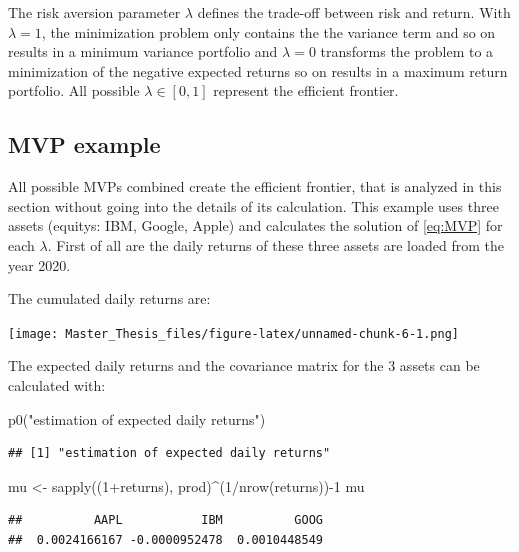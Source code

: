 \documentclass[
  oneside]{book}
\newenvironment{Shaded}{\begin{snugshade}}{\end{snugshade}}
\newcommand{\DecValTok}[1]{\textcolor[rgb]{0.00,0.00,0.81}{#1}}
\newcommand{\FunctionTok}[1]{\textcolor[rgb]{0.00,0.00,0.00}{#1}}
\newcommand{\NormalTok}[1]{#1}
\newcommand{\OtherTok}[1]{\textcolor[rgb]{0.56,0.35,0.01}{#1}}
\newcommand{\SpecialCharTok}[1]{\textcolor[rgb]{0.00,0.00,0.00}{#1}}
\newcommand{\StringTok}[1]{\textcolor[rgb]{0.31,0.60,0.02}{#1}}
\begin{document}
The risk aversion parameter \(\lambda\) defines the trade-off between risk and return. With \(\lambda = 1\), the minimization problem only contains the the variance term and so on results in a minimum variance portfolio and \(\lambda = 0\) transforms the problem to a minimization of the negative expected returns so on results in a maximum return portfolio. All possible \(\lambda \in [0, 1]\) represent the efficient frontier.

\hypertarget{mvp-example}{%
\subsection{MVP example}\label{mvp-example}}

All possible MVPs combined create the efficient frontier, that is analyzed in this section without going into the details of its calculation. This example uses three assets (equitys: IBM, Google, Apple) and calculates the solution of \ref{eq:MVP} for each \(\lambda\). First of all are the daily returns of these three assets are loaded from the year 2020.

The cumulated daily returns are:

\texttt{[image: Master\_Thesis\_files/figure-latex/unnamed-chunk-6-1.png]}

The expected daily returns and the covariance matrix for the 3 assets can be calculated with:

\begin{Shaded}
\begin{Highlighting}[]
\FunctionTok{p0}\NormalTok{(}\StringTok{"estimation of expected daily returns"}\NormalTok{)}
\end{Highlighting}
\end{Shaded}

\begin{verbatim}
## [1] "estimation of expected daily returns"
\end{verbatim}

\begin{Shaded}
\begin{Highlighting}[]
\NormalTok{mu }\OtherTok{\textless{}{-}} \FunctionTok{sapply}\NormalTok{((}\DecValTok{1}\SpecialCharTok{+}\NormalTok{returns), prod)}\SpecialCharTok{\^{}}\NormalTok{(}\DecValTok{1}\SpecialCharTok{/}\FunctionTok{nrow}\NormalTok{(returns))}\SpecialCharTok{{-}}\DecValTok{1}
\NormalTok{mu}
\end{Highlighting}
\end{Shaded}

\begin{verbatim}
##          AAPL           IBM          GOOG 
##  0.0024166167 -0.0000952478  0.0010448549
\end{verbatim}
\end{document}
